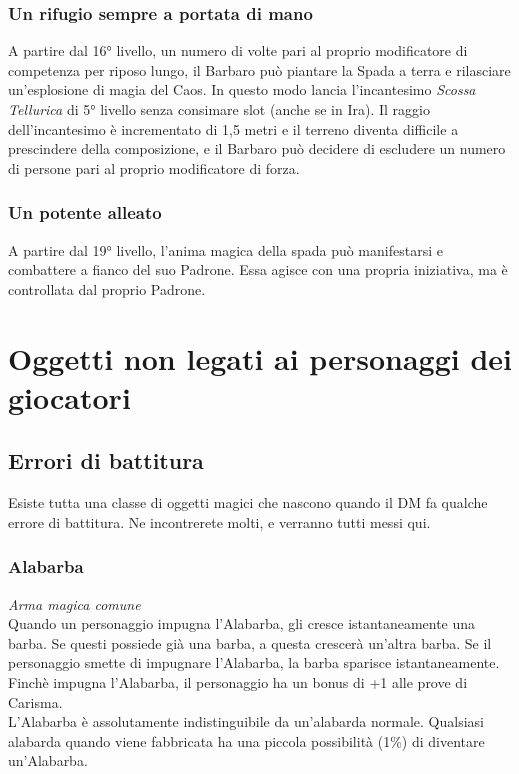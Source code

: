 \subsubsection{Un rifugio sempre a portata di mano}
A partire dal 16° livello, un numero di volte pari al proprio modificatore di competenza per riposo lungo, il Barbaro può piantare la Spada a terra e rilasciare un'esplosione di magia del Caos. In questo modo lancia l'incantesimo \textit{Scossa Tellurica} di 5° livello senza consimare slot (anche se in Ira). Il raggio dell'incantesimo è incrementato di 1,5 metri e il terreno diventa difficile a prescindere della composizione, e il Barbaro può decidere di escludere un numero di persone pari al proprio modificatore di forza. 

\subsubsection{Un potente alleato}
A partire dal 19° livello, l'anima magica della spada può manifestarsi e combattere a fianco del suo Padrone. Essa agisce con una propria iniziativa, ma è controllata dal proprio Padrone. 


\section{Oggetti non legati ai personaggi dei giocatori}

\subsection{Errori di battitura}
Esiste tutta una classe di oggetti magici che nascono quando il DM fa qualche errore di battitura. Ne incontrerete molti, e verranno tutti messi qui.

\subsubsection{Alabarba}
\textit{Arma magica comune}\\
Quando un personaggio impugna l'Alabarba, gli cresce istantaneamente una barba. Se questi possiede già una barba, a questa crescerà un'altra barba. Se il personaggio smette di impugnare l'Alabarba, la barba sparisce istantaneamente. Finchè impugna l'Alabarba, il personaggio ha un bonus di +1 alle prove di Carisma.\\
L'Alabarba è assolutamente indistinguibile da un'alabarda normale. Qualsiasi alabarda quando viene fabbricata ha una piccola possibilità (1\%) di diventare un'Alabarba.

